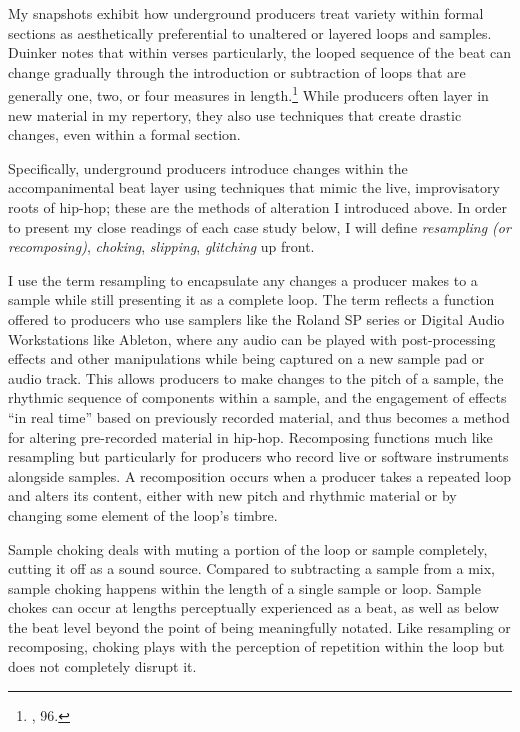 My snapshots exhibit how underground producers treat variety within formal sections as aesthetically preferential to unaltered or layered loops and samples. Duinker notes that within verses particularly, the looped sequence of the beat can change gradually through the introduction or subtraction of loops that are generally one, two, or four measures in length.\footnote{\cite{benduinkerSongFormMainstreaming2020}, 96.} While producers often layer in new material in my repertory, they also use techniques that create drastic changes, even within a formal section. 

Specifically, underground producers introduce changes within the accompanimental beat layer using techniques that mimic the live, improvisatory roots of hip-hop; these are the methods of alteration I introduced above. In order to present my close readings of each case study below, I will define \emph{resampling (or recomposing)}, \emph{choking}, \emph{slipping}, \emph{glitching} up front.

I use the term resampling to encapsulate any changes a producer makes to a sample while still presenting it as a complete loop. The term reflects a function offered to producers who use samplers like the Roland SP series or Digital Audio Workstations like Ableton, where any audio can be played with post-processing effects and other manipulations while being captured on a new sample pad or audio track. This allows producers to make changes to the pitch of a sample, the rhythmic sequence of components within a sample, and the engagement of effects ``in real time'' based on previously recorded material, and thus becomes a method for altering pre-recorded material in hip-hop. Recomposing functions much like resampling but particularly for producers who record live or software instruments alongside samples. A recomposition occurs when a producer takes a repeated loop and alters its content, either with new pitch and rhythmic material or by changing some element of the loop's timbre. 

Sample choking deals with muting a portion of the loop or sample completely, cutting it off as a sound source. Compared to subtracting a sample from a mix, sample choking happens within the length of a single sample or loop. Sample chokes can occur at lengths perceptually experienced as a beat, as well as below the beat level beyond the point of being meaningfully notated. Like resampling or recomposing, choking plays with the perception of repetition within the loop but does not completely disrupt it.

